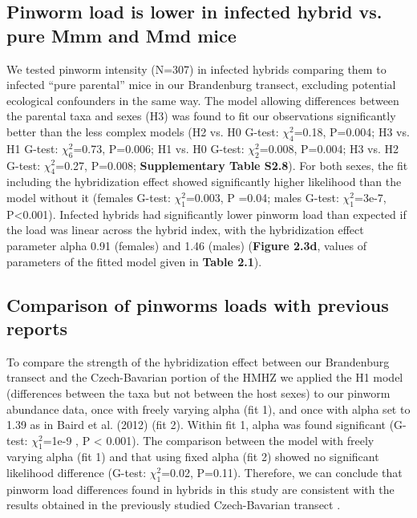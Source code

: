 \subsection{Pinworm load is lower in infected hybrid vs. pure Mmm and Mmd mice} 
We tested pinworm intensity (N=307) in infected hybrids comparing them to infected “pure parental” mice in our Brandenburg transect, excluding potential ecological confounders in the same way. The model allowing differences between the parental taxa and sexes (H3) was found to fit our observations significantly better than the less complex models (H2 vs. H0 G-test: $\chi_{4}^{2}$=0.18, P=0.004; H3 vs. H1 G-test: $\chi_{6}^{2}$=0.73, P=0.006; H1 vs. H0 G-test: $\chi_{2}^{2}$=0.008, P=0.004; H3 vs. H2 G-test: $\chi_{4}^{2}$=0.27, P=0.008; \textbf{Supplementary Table S2.8}). For both sexes, the fit including the hybridization effect showed significantly higher likelihood than the model without it (females G-test: $\chi_{1}^{2}$=0.003, P =0.04; males G-test: $\chi_{1}^{2}$=3e-7, P<0.001). Infected hybrids had significantly lower pinworm load than expected if the load was linear across the hybrid index, with the hybridization effect parameter alpha 0.91 (females) and 1.46 (males) (\textbf{Figure 2.3d}, values of parameters of the fitted model given in \textbf{Table 2.1}).

\subsection{Comparison of pinworms loads with previous reports}
To compare the strength of the hybridization effect between our Brandenburg transect and the Czech-Bavarian portion of the HMHZ we applied the H1 model (differences between the taxa but not between the host sexes) to our pinworm abundance data, once with freely varying alpha (fit 1), and once with alpha set to 1.39 as in Baird et al. (2012) (fit 2). Within fit 1, alpha was found significant (G-test: $\chi_{1}^{2}$=1e-9 , P < 0.001). The comparison between the model with freely varying alpha (fit 1) and that using fixed alpha (fit 2) showed no significant likelihood difference (G-test: $\chi_{1}^{2}$=0.02, P=0.11). Therefore, we can conclude that pinworm load differences found in hybrids in this study are consistent with the results obtained in the previously studied Czech-Bavarian transect \citep{baird_where_2012}. 

